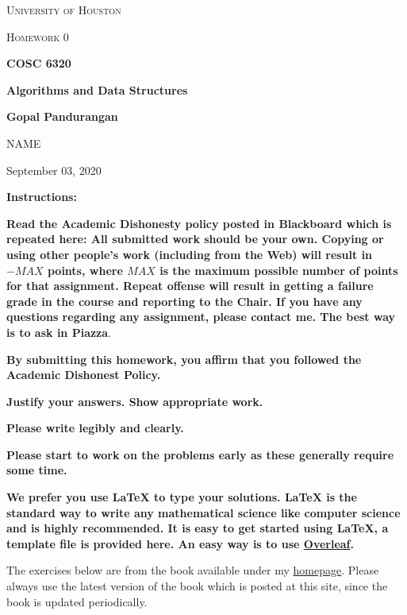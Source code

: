 \documentclass[a4paper]{article}
\begin{document}
\begin{titlepage}
    \begin{center}
        {\scshape\LARGE University of Houston\par}
        \vspace{1cm}
        {\scshape\Large Homework 0 \par}
        \vspace{1.5cm}
        {\huge\bfseries COSC 6320 \par}
        {\huge\bfseries Algorithms and Data Structures \par}
        \vspace{0.5cm}
        {\large\bfseries Gopal Pandurangan\par}
        \vspace{2cm}
        {\Large NAME\par}
        \vspace{0.5cm}
        {\large \par} September 03, 2020
    \end{center}

    \textbf{Instructions:}

    \textbf{Read the Academic Dishonesty policy posted in Blackboard which is repeated here:
        All submitted work should be  your own. Copying or using other people's work (including  from the Web) will result in $-MAX$ points, where $MAX$ is the maximum possible number of points for that assignment. Repeat offense will result in getting a failure grade in the course and reporting to the Chair. If you have any questions regarding any assignment, please contact me. The best way is to ask in Piazza}.


    \textbf{By submitting this homework, you affirm that you followed the Academic Dishonest Policy.}

    \textbf{Justify your answers. Show appropriate work.}

    \textbf{Please write legibly and clearly.}

    \textbf{Please start to work on the problems early as these generally require some time.}

    \textbf{We prefer you use LaTeX to type your solutions. LaTeX is the standard way to write any mathematical science like
        computer science and is highly recommended. It is easy to get started using LaTeX, a template file is provided here.
        An easy way is to use \href{https://www.overleaf.com/}{Overleaf}.}

    The exercises below are from the book available under my \href{https://sites.google.com/site/gopalpandurangan/home/algorithms-course}{homepage}. Please always use the latest version of the book which is posted at this site, since the book is updated periodically.


\end{titlepage}
\end{document}
